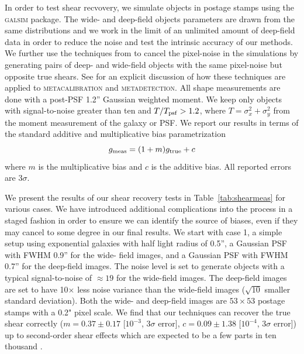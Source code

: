 \documentclass[twocolumn]{openjournal}
\makeatletter
\newcommand{\mdet}{\textsc{metadetection}\@\xspace}
\newcommand{\mcal}{\textsc{metacalibration}\@\xspace}
\newcommand{\galsim}{\textsc{galsim}\@\xspace}
\makeatother
\begin{document}
In order to test shear recvovery, we simulate objects in postage stamps using the
\galsim package. The wide- and deep-field objects parameters are drawn from the same distributions
and we work in the limit of an unlimited amount of deep-field data in order to reduce
the noise and test the intrinsic accuracy of our methods. We further use the techniques
from \citet{pujol2019} to cancel the pixel-noise in the simulations by generating pairs
of deep- and wide-field objects with the same pixel-noise but opposite true shears. See
\citet{SheldonMdet2020} for an explicit discussion of how these techniques are applied
to \mcal and \mdet. All shape measurements are done with a post-PSF 1.2'' Gaussian
weighted moment. We keep only objects with signal-to-noise greater than ten and
$T/T_{\rm psf} > 1.2$, where $T=\sigma_{x}^2 + \sigma_{y}^2$ from the moment measurement
of the galaxy or PSF. We report our results in terms of the standard additive and
multiplicative bias parametrization \citep[see, e.g.,][]{heymans2006}
\begin{equation*}
g_{\rm meas} = (1+m)g_{\rm true} + c
\end{equation*}
where $m$ is the multiplicative bias and $c$ is the additive bias. All reported errors
are $3\sigma$.

We present the results of our shear recovery tests in Table~\ref{tab:shearmeas} for
various cases. We have introduced additional complications into the process in a staged
fashion in order to ensure we can identify the source of biases, even if
they may cancel to some degree in our final results. We start with
case 1, a simple setup using exponential galaxies with half light radius of 0.5'', a
Gaussian PSF with FWHM 0.9'' for the wide- field images, and a Gaussian PSF with FWHM
0.7'' for the deep-field images. The noise level is set to generate objects with a
typical signal-to-noise of $\approx19$ for the wide-field images. The deep-field images
are set to have 10$\times$ less noise variance than the wide-field images ($\sqrt{10}$
smaller standard deviation).
Both the wide- and
deep-field images are $53\times53$ postage stamps with a 0.2" pixel scale.
We find that our
techniques can recover the true shear correctly ($m=0.37\pm0.17$ [$10^{-3}$, $3\sigma$
error], $c=0.09\pm1.38$ [$10^{-4}$, $3\sigma$ error]) up to second-order shear effects
which are expected to be a few parts in ten thousand
\citep{SheldonMcal2017,SheldonMdet2020}.
\end{document}
